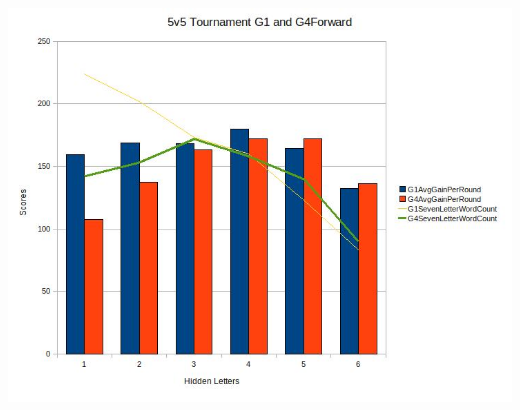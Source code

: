 \documentclass[11pt]{article}
\begin{document}
	\begin{center}
\includegraphics[width=1 \textwidth]{5v5optionG1G4}
\end{center}
\end{document}
